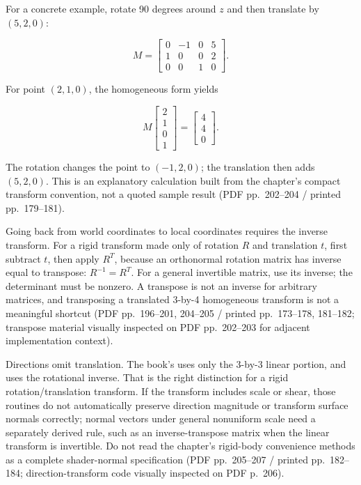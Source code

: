 For a concrete example, rotate 90 degrees around \(z\) and then translate by \((5,2,0)\):

\[
M = \begin{bmatrix}0&-1&0&5\\1&0&0&2\\0&0&1&0\end{bmatrix}.
\]

For point \((2,1,0)\), the homogeneous form yields

\[
M\begin{bmatrix}2\\1\\0\\1\end{bmatrix}=\begin{bmatrix}4\\4\\0\end{bmatrix}.
\]

The rotation changes the point to \((-1,2,0)\); the translation then adds \((5,2,0)\). This is an explanatory calculation built from the chapter's compact transform convention, not a quoted sample result (PDF pp.~202--204 / printed pp.~179--181).

Going back from world coordinates to local coordinates requires the inverse transform. For a rigid transform made only of rotation \(R\) and translation \(t\), first subtract \(t\), then apply \(R^T\), because an orthonormal rotation matrix has inverse equal to transpose: \(R^{-1}=R^T\). For a general invertible matrix, use its inverse; the determinant must be nonzero. A transpose is not an inverse for arbitrary matrices, and transposing a translated 3-by-4 homogeneous transform is not a meaningful shortcut (PDF pp.~196--201, 204--205 / printed pp.~173--178, 181--182; transpose material visually inspected on PDF pp.~202--203 for adjacent implementation context).

Directions omit translation. The book's  uses only the 3-by-3 linear portion, and  uses the rotational inverse. That is the right distinction for a rigid rotation/translation transform. If the transform includes scale or shear, those routines do not automatically preserve direction magnitude or transform surface normals correctly; normal vectors under general nonuniform scale need a separately derived rule, such as an inverse-transpose matrix when the linear transform is invertible. Do not read the chapter's rigid-body convenience methods as a complete shader-normal specification (PDF pp.~205--207 / printed pp.~182--184; direction-transform code visually inspected on PDF p.~206).

